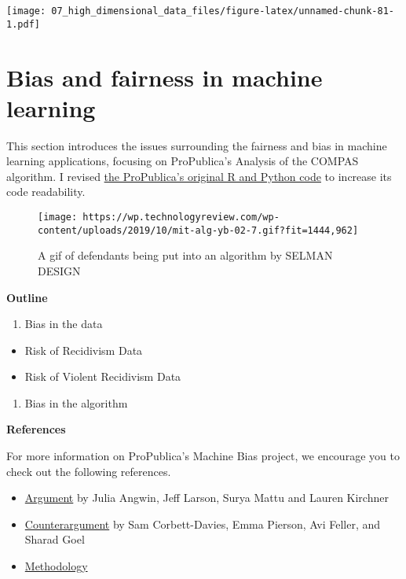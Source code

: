 \documentclass[
]{book}
\providecommand{\tightlist}{%
  \setlength{\itemsep}{0pt}\setlength{\parskip}{0pt}}
\begin{document}
\texttt{[image: 07\_high\_dimensional\_data\_files/figure-latex/unnamed-chunk-81-1.pdf]}

\hypertarget{bias-and-fairness-in-machine-learning}{%
\section{Bias and fairness in machine learning}\label{bias-and-fairness-in-machine-learning}}

This section introduces the issues surrounding the fairness and bias in machine learning applications, focusing on ProPublica's Analysis of the COMPAS algorithm. I revised \href{https://github.com/propublica/compas-analysis/blob/master/Compas\%20Analysis.ipynb}{the ProPublica's original R and Python code} to increase its code readability.

\begin{figure}
\centering
\texttt{[image: https://wp.technologyreview.com/wp-content/uploads/2019/10/mit-alg-yb-02-7.gif?fit=1444,962]}
\caption{A gif of defendants being put into an algorithm by SELMAN DESIGN}
\end{figure}

\textbf{Outline}

\begin{enumerate}
\def\labelenumi{\arabic{enumi}.}
\tightlist
\item
  Bias in the data
\end{enumerate}

\begin{itemize}
\tightlist
\item
  Risk of Recidivism Data
\item
  Risk of Violent Recidivism Data
\end{itemize}

\begin{enumerate}
\def\labelenumi{\arabic{enumi}.}
\setcounter{enumi}{1}
\tightlist
\item
  Bias in the algorithm
\end{enumerate}

\textbf{References}

For more information on ProPublica's Machine Bias project, we encourage you to check out the following references.

\begin{itemize}
\item
  \href{https://www.propublica.org/article/machine-bias-risk-assessments-in-criminal-sentencing/}{Argument} by Julia Angwin, Jeff Larson, Surya Mattu and Lauren Kirchner
\item
  \href{https://www.washingtonpost.com/news/monkey-cage/wp/2016/10/17/can-an-algorithm-be-racist-our-analysis-is-more-cautious-than-propublicas/}{Counterargument} by Sam Corbett-Davies, Emma Pierson, Avi Feller, and Sharad Goel
\item
  \href{https://www.propublica.org/article/how-we-analyzed-the-compas-recidivism-algorithm/}{Methodology}
\end{itemize}
\end{document}
